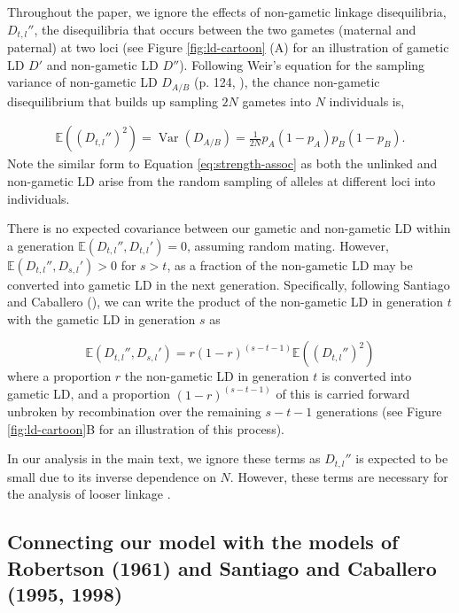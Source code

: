 \documentclass[11pt]{article}
\newcommand{\E}{\mathbb{E}}
\DeclareMathOperator{\var}{Var}
\begin{document}
Throughout the paper, we ignore the effects of non-gametic linkage
disequilibria, $D_{t,l}''$, the disequilibria that occurs between the two
gametes (maternal and paternal) at two loci (see Figure \ref{fig:ld-cartoon}
(A) for an illustration of gametic LD $D'$ and non-gametic LD $D''$). Following
Weir's equation for the sampling variance of non-gametic LD $D_{A/B}$ (p. 124,
\citeyear{Weir1996-mv}), the chance non-gametic disequilibrium that builds up
sampling $2N$ gametes into $N$ individuals is,

\begin{align}
  \E\left((D_{t,l}'')^2\right) = \var(D_{A/B})  = \frac{1}{2N} p_A (1-p_A) p_B (1-p_B).
  \label{eq:non-gametic}
\end{align}
%
Note the similar form to Equation \eqref{eq:strength-assoc} as both the
unlinked and non-gametic LD arise from the random sampling of alleles at
different loci into individuals.

There is no expected covariance between our gametic and non-gametic LD within a
generation $\E(D_{t,l}'', D_{t,l}')=0$, assuming random mating. However,
$\E(D_{t,l}'',D_{s,l}')>0$ for $s>t$, as a fraction of the non-gametic LD
may be converted into gametic LD in the next generation. Specifically,
following Santiago and Caballero (\citeyear{Santiago1995-hx}), we can write the
product of the non-gametic LD in generation $t$ with the gametic LD in
generation $s$ as

\begin{equation}
  \E(D_{t,l}'',D_{s,l}') = r(1-r)^{(s-t-1)} \E\left((D_{t,l}'')^2\right)
  \end{equation}
%
where a proportion $r$ the non-gametic LD in generation $t$ is converted into
gametic LD, and a proportion $(1-r)^{(s-t-1)}$ of this is carried forward
unbroken by recombination over the remaining $s-t-1$ generations (see Figure
\ref{fig:ld-cartoon}B for an illustration of this process).

In our analysis in the main text, we ignore these terms as $D_{t,l}''$ is
expected to be small due to its inverse dependence on $N$. However, these terms
are necessary for the analysis of looser linkage
\parencite{Santiago1995-hx,Santiago1998-bs}. 

\subsection{Connecting our model with the models of Robertson (1961) and Santiago and Caballero (1995, 1998)}
\label{ap:connecting-sc}
\end{document}
